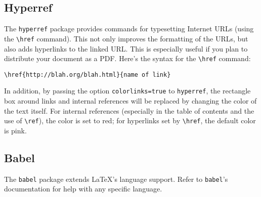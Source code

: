\subsection{Hyperref}
\label{sec:hyperref}

The \texttt{hyperref} package provides commands for typesetting
Internet URLs (using the \verb|\href| command).  This not only
improves the formatting of the URLs, but also adds hyperlinks to the
linked URL.  This is especially useful if you plan to distribute your
document as a PDF.  Here's the syntax for the \verb|\href| command:
\begin{verbatim}
\href{http://blah.org/blah.html}{name of link}
\end{verbatim}

In addition, by passing the option \texttt{colorlinks=true} to
\texttt{hyperref}, the rectangle box around links and internal
references will be replaced by changing the color of the text itself.
For internal references (especially in the table of contents and the
use of \verb|\ref|), the color is set to red; for hyperlinks set by
\verb|\href|, the default color is pink.

\subsection{Babel}
\label{sec:babel}

The \texttt{babel} package extends \LaTeX's language support.  Refer
to \texttt{babel}'s documentation for help with any specific language.

